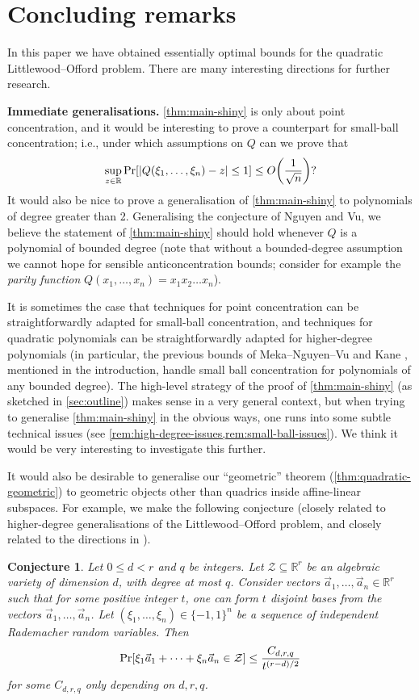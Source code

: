 \documentclass[english]{article}
\newtheorem{conjecture}[theorem]{Conjecture}
\theoremstyle{remark}
\numberwithin{equation}{section}
\numberwithin{figure}{section}
\newcommand{\su}{\subseteq}
\newcommand{\RR}{\mathbb{R}}
\let\originalleft\left
\let\originalright\right
\renewcommand{\left}{\mathopen{}\mathclose\bgroup\originalleft}
\renewcommand{\right}{\aftergroup\egroup\originalright}
\begin{document}
\section{Concluding remarks}\label{subsec:further-directions}
In this paper we have obtained essentially optimal bounds for the quadratic Littlewood--Offord problem. There are many interesting directions for further research.

\textbf{Immediate generalisations.}
\cref{thm:main-shiny} is only about point concentration, and it would be interesting
to prove a counterpart for small-ball concentration; i.e., under which
assumptions on $Q$ can we prove that
\[
\sup_{z\in\RR}\Pr[|Q(\xi_{1},\dots,\xi_{n})-z|\le1]\le O\left(\frac{1}{\sqrt{n}}\right)?
\]
It would also be nice to prove a generalisation of \cref{thm:main-shiny} to polynomials of
degree greater than 2. Generalising the conjecture of Nguyen and Vu,
we believe the statement of \cref{thm:main-shiny} should hold whenever $Q$ is a polynomial
of bounded degree (note that without a bounded-degree assumption we cannot hope for sensible anticoncentration bounds; consider for example the \emph{parity
function} $Q(x_{1},\dots,x_{n})=x_{1}x_{2}\dots x_{n}$).

It is sometimes the case that techniques for point concentration can be straightforwardly
adapted for small-ball concentration, and techniques for quadratic
polynomials can be straightforwardly adapted for higher-degree polynomials (in particular,
the previous bounds of Meka--Nguyen--Vu \cite{MNV16} and Kane \cite{Kan14}, mentioned in the introduction, handle small ball concentration for polynomials
of any bounded degree). The high-level strategy of the proof of \cref{thm:main-shiny} (as sketched in \cref{sec:outline}) makes sense in a very general context, but when trying to generalise \cref{thm:main-shiny} in the obvious ways, one runs into some subtle technical issues (see \cref{rem:high-degree-issues,rem:small-ball-issues}). We think it would be very interesting to investigate this further.

It would also be desirable to generalise our ``geometric'' theorem (\cref{thm:quadratic-geometric}) to geometric objects other than quadrics inside affine-linear subspaces. For example, we make the following conjecture (closely related to higher-degree generalisations of the Littlewood--Offord problem, and closely related to the directions in \cite{FKS23}).

\begin{conjecture}Let $0\le d<r$ and $q$ be integers. Let $\mathcal{Z}\su\RR^{r}$ be an algebraic variety of dimension $d$, with degree at most $q$. Consider vectors $\vec{a}_{1},\dots,\vec{a}_{n}\in\mathbb{R}^{r}$ such that for some positive integer $t$, one can form $t$ disjoint bases from the vectors $\vec{a}_{1},\dots, \vec{a}_n$. Let $(\xi_1,\dots,\xi_n)\in\{-1,1\}^{n}$ be a sequence of independent Rademacher random variables. Then 
\[
\Pr\left[\xi_{1}\vec{a}_{1}+\dots+\xi_{n}\vec{a}_{n}\in\mathcal{Z}\right]\le\frac{C_{d,r,q}}{t^{(r-d)/2}}
\]
for some $C_{d,r,q}$ only depending on $d,r,q$.
\end{conjecture}
\end{document}
